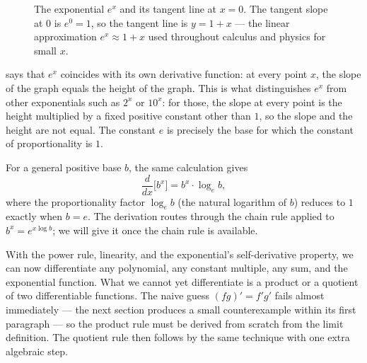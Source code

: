 \begin{figure}[H]
\centering
{}
\caption{The exponential \(e^{x}\) and its tangent line at \(x = 0\). The tangent slope at \(0\) is \(e^{0} = 1\), so the tangent line is \(y = 1 + x\) --- the linear approximation \(e^{x} \approx 1 + x\) used throughout calculus and physics for small \(x\).}
\label{fig:exp-tangent-at-zero}
\end{figure}

\begin{remark}
 says that \(e^{x}\) coincides with its own derivative function: at every point \(x\), the slope of the graph equals the height of the graph. This is what distinguishes \(e^{x}\) from other exponentials such as \(2^{x}\) or \(10^{x}\): for those, the slope at every point is the height multiplied by a fixed positive constant other than \(1\), so the slope and the height are not equal. The constant \(e\) is precisely the base for which the constant of proportionality is \(1\).
\end{remark}

\begin{remark}[Derivative of \(b^{x}\)]
For a general positive base \(b\), the same calculation gives
\[
\frac{d}{dx}\bigl[b^{x}\bigr] = b^{x} \cdot \log_{e} b,
\]
where the proportionality factor \(\log_{e} b\) (the natural logarithm of \(b\)) reduces to \(1\) exactly when \(b = e\). The derivation routes through the chain rule applied to \(b^{x} = e^{x \log b}\); we will give it once the chain rule is available.
\end{remark}

With the power rule, linearity, and the exponential's self-derivative property, we can now differentiate any polynomial, any constant multiple, any sum, and the exponential function. What we cannot yet differentiate is a product or a quotient of two differentiable functions. The naive guess \((f g)' = f' g'\) fails almost immediately --- the next section produces a small counterexample within its first paragraph --- so the product rule must be derived from scratch from the limit definition. The quotient rule then follows by the same technique with one extra algebraic step.

